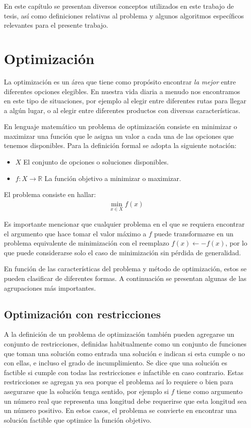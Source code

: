 En este capítulo se presentan diversos conceptos utilizados en este trabajo de tesis, así como definiciones relativas al problema 
y algunos algoritmos específicos relevantes para el presente trabajo.

\section{Optimización}
La optimización es un área que tiene como propósito encontrar \textit{la mejor} entre diferentes opciones elegibles. 
%
En nuestra vida diaria a menudo nos encontramos en este tipo de situaciones, por ejemplo al elegir entre diferentes rutas para 
llegar a algún lugar, o al elegir entre diferentes productos con diversas características.

En lenguaje matemático un problema de optimización consiste en minimizar o maximizar una función que le asigna un valor a cada una 
de las opciones que tenemos disponibles. 
%
Para la definición formal se adopta la siguiente notación:
\begin{itemize}
    \item $X$ El conjunto de opciones o soluciones disponibles.
    \item $f:X\rightarrow \mathbb{R}$ La función objetivo a minimizar o maximizar.
\end{itemize}

El problema consiste en hallar:
\begin{gather}
\min_{x\in X} f(x)
\end{gather}

Es importante mencionar que cualquier problema en el que se requiera encontrar el argumento que hace tomar el valor máximo a $f$ 
puede transformarse en un problema equivalente de minimización con el reemplazo $f(x) \leftarrow -f(x)$, por lo que puede considerarse 
solo el caso de minimización sin pérdida de generalidad.

En función de las características del problema y método de optimización, estos se pueden clasificar de diferentes formas. 
%
A continuación se presentan algunas de las agrupaciones más importantes.

\subsection*{Optimización con restricciones}
A la definición de un problema de optimización también pueden agregarse un conjunto de restricciones, definidas habitualmente como
un conjunto de funciones que toman una solución como entrada una solución e indican si esta cumple o no con ellas, e incluso el grado
de incumplimiento.
%
Se dice que una solución es factible si cumple con todas las restricciones e infactible en caso contrario.
%
Estas restricciones se agregan ya sea porque el problema así lo requiere o bien para asegurarse que la solución tenga sentido, por ejemplo 
si $f$ tiene como argumento un número real que representa una longitud debe requerirse que esta longitud sea un número positivo.
%
En estos casos, el problema se convierte en encontrar una solución factible que optimice la función objetivo.

